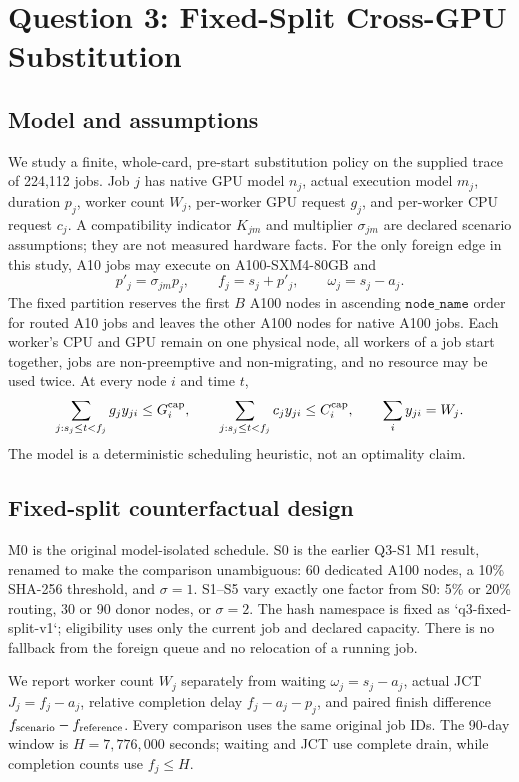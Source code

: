 \section{Question 3: Fixed-Split Cross-GPU Substitution}
\label{sec:q3}

\subsection{Model and assumptions}
We study a finite, whole-card, pre-start substitution policy on the supplied trace of 224,112 jobs. Job $j$ has native GPU model $n_j$, actual execution model $m_j$, duration $p_j$, worker count $W_j$, per-worker GPU request $g_j$, and per-worker CPU request $c_j$. A compatibility indicator $K_{jm}$ and multiplier $\sigma_{jm}$ are declared scenario assumptions; they are not measured hardware facts. For the only foreign edge in this study, A10 jobs may execute on A100-SXM4-80GB and
\begin{equation}
 p'_j=\sigma_{jm}p_j,\qquad f_j=s_j+p'_j,\qquad \omega_j=s_j-a_j.
\end{equation}
The fixed partition reserves the first $B$ A100 nodes in ascending $\texttt{node\_name}$ order for routed A10 jobs and leaves the other A100 nodes for native A100 jobs. Each worker's CPU and GPU remain on one physical node, all workers of a job start together, jobs are non-preemptive and non-migrating, and no resource may be used twice. At every node $i$ and time $t$,
\begin{equation}
 \sum_{j:s_j\le t<f_j}g_jy_{ji}\le G_i^{\rm cap},\qquad
 \sum_{j:s_j\le t<f_j}c_jy_{ji}\le C_i^{\rm cap},\qquad
 \sum_i y_{ji}=W_j.
\end{equation}
The model is a deterministic scheduling heuristic, not an optimality claim.

\subsection{Fixed-split counterfactual design}
M0 is the original model-isolated schedule. S0 is the earlier Q3-S1 M1 result, renamed to make the comparison unambiguous: 60 dedicated A100 nodes, a 10\% SHA-256 threshold, and $\sigma=1$. S1--S5 vary exactly one factor from S0: 5\% or 20\% routing, 30 or 90 donor nodes, or $\sigma=2$. The hash namespace is fixed as `q3-fixed-split-v1`; eligibility uses only the current job and declared capacity. There is no fallback from the foreign queue and no relocation of a running job.

We report worker count $W_j$ separately from waiting $\omega_j=s_j-a_j$, actual JCT $J_j=f_j-a_j$, relative completion delay $f_j-a_j-p_j$, and paired finish difference $f_{\rm scenario}-f_{\rm reference}$. Every comparison uses the same original job IDs. The 90-day window is $H=7,776,000$ seconds; waiting and JCT use complete drain, while completion counts use $f_j\le H$.


